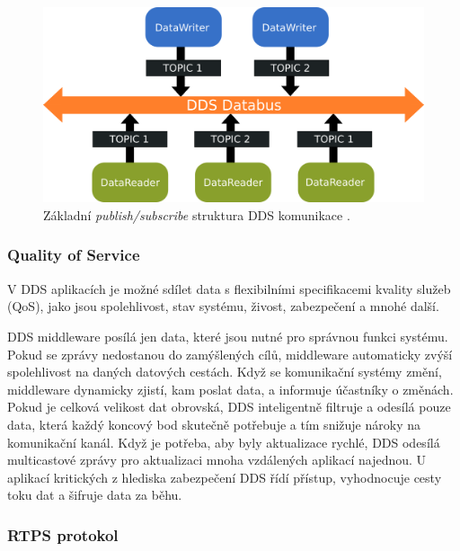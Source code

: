 \begin{figure}[!ht]
  \begin{center}
    \includegraphics[scale=0.35]{obrazky/DDS2}
  \end{center}
  \caption[Základní \textit{publish/subscribe} struktura \acs{DDS} komunikace]{Základní \textit{publish/subscribe} struktura \acs{DDS} komunikace \cite{DDS_PubSub}.}
  \label{fig:DDSarch}
\end{figure}

\subsubsection{Quality of Service}

V \acs{DDS} aplikacích je možné sdílet data s flexibilními specifikacemi kvality služeb (\acs{QoS}), jako jsou spolehlivost, stav systému, živost, zabezpečení a mnohé další. 

\acs{DDS} middleware posílá jen data, které jsou nutné pro správnou funkci systému. Pokud se zprávy nedostanou do zamýšlených cílů, middleware automaticky zvýší spolehlivost na daných datových cestách. Když se komunikační systémy změní, middleware dynamicky zjistí, kam poslat data, a informuje účastníky o změnách. Pokud je celková velikost dat obrovská, \acs{DDS} inteligentně filtruje a odesílá pouze data, která každý koncový bod skutečně potřebuje a tím snižuje nároky na komunikační kanál. Když je potřeba, aby byly aktualizace rychlé, \acs{DDS} odesílá multicastové zprávy pro aktualizaci mnoha vzdálených aplikací najednou. U aplikací kritických z hlediska zabezpečení \acs{DDS} řídí přístup, vyhodnocuje cesty toku dat a šifruje data za běhu. \cite{DDS_Main}

\subsubsection{\acs{RTPS} protokol}

